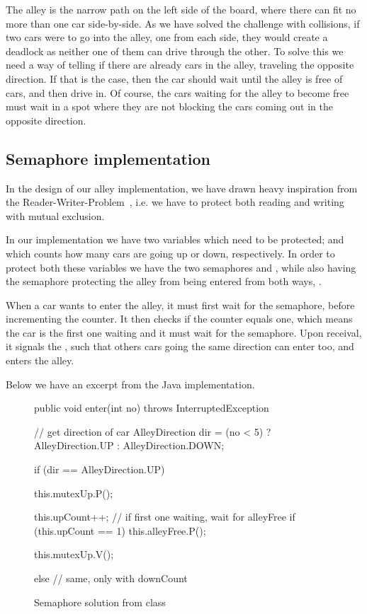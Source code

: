 
The alley is the narrow path on the left side of the board, where
there can fit no more than one car side-by-side. As we have solved the
challenge with collisions, if two cars were to go into the alley, one
from each side, they would create a deadlock as neither one of them
can drive through the other. To solve this we need a way of telling if
there are already cars in the alley, traveling the opposite
direction. If that is the case, then the car should wait until the
alley is free of cars, and then drive in. Of course, the cars waiting
for the alley to become free must wait in a spot where they are not
blocking the cars coming out in the opposite direction.


\subsection{Semaphore implementation}
\label{sub:all-sema}
In the design of our alley implementation, we have drawn heavy inspiration from the
Reader-Writer-Problem~\cite[p. 170]{andrews}, i.e. we have to protect
both reading and writing with mutual exclusion.

In our implementation we have two variables which need to be
protected;  and  which counts how many
cars are going up or down, respectively. In order to protect both
these variables we have the two semaphores  and
, while also having the semaphore protecting the alley
from being entered from both ways, .

When a car wants to enter the alley, it must first wait for the
 semaphore, before incrementing the counter. It then checks if the counter
equals one, which means the car is the first one waiting and it must wait
for the  semaphore. Upon receival, it signals the
, such that others cars going the same direction can enter too, and enters the alley.

Below we have an excerpt from the Java implementation.

\begin{figure}[H]
  \begin{java}
public void enter(int no) throws InterruptedException {
  // get direction of car
  AlleyDirection dir = (no < 5) ? AlleyDirection.UP : AlleyDirection.DOWN;

  if (dir == AlleyDirection.UP) {
    this.mutexUp.P();

    this.upCount++;
    // if first one waiting, wait for alleyFree
    if (this.upCount == 1)
      this.alleyFree.P();

    this.mutexUp.V();

  } else {
    // same, only with downCount
  }
}
  \end{java}
  \caption{Semaphore solution from  class}
\label{lst:all-sem}
\end{figure}

